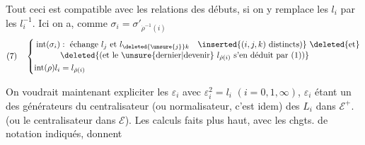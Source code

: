 Tout ceci est compatible avec les relations des débuts, 
  si on y remplace les $l_i$ par les $l_i^{-1}$.
Ici on a, comme $\sigma_i=\sigma'_{\dot\rho^{-1}(i)}$
\[
(7)\quad\left\{\begin{aligned}
\operatorname{int}(\sigma_i)&:\text{ échange }l_j\text{ et }l_{\deleted{\unsure{j}}k}
\quad\inserted{(i,j,k)\text{ distincts})}\ \deleted{\text{et}}\\[-2pt]
&\deleted{\text{(et le }\unsure{\text{dernier}|\text{devenir}}\ l_{\dot\rho(i)}\ \text{s'en déduit par (1))}}\\
\operatorname{int}(\rho)l_i&=l_{\dot\rho(i)}
\end{aligned}\right.
\]

On voudrait maintenant expliciter les $\varepsilon_i$ avec $\varepsilon_i^2=l_i$ $(i=0,1,\infty)$, $\varepsilon_i$ étant un des générateurs du centralisateur (ou normalisateur, c'est idem) des $L_i$ dans $\mathcal E^+$. (ou le centralisateur dans $\mathcal E$). Les calculs faits plus haut, avec les chgts. de notation indiqués, donnent
\deleted{\[
(8)\quad\left\{\begin{aligned}
\varepsilon_0&=l_0^{\deleted{\unsure{-1}}}\sigma_1 l_{\unsure{0|1}}^{\deleted{\unsure{-1}}}\\
\varepsilon_1&=l_\infty^{-1}\sigma_\infty l_1^{-1}\\
\varepsilon_\infty&=l_0^{-1}\sigma_0 l_\infty^{\unsure{-1}}
\end{aligned}\right.
\]}

